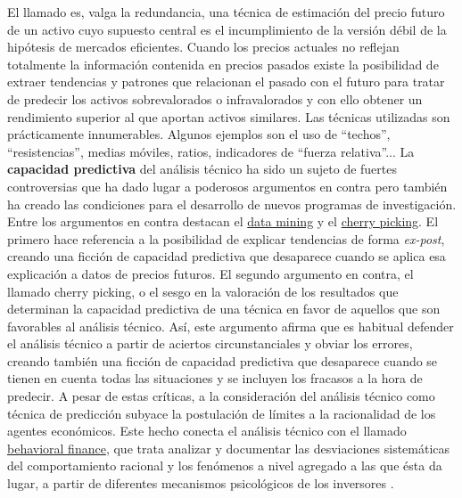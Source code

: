 \documentclass{nuevotema}
\begin{document}
El llamado  es, valga la redundancia, una técnica de estimación del precio futuro de un activo cuyo supuesto central es el incumplimiento de la versión débil de la hipótesis de mercados eficientes. Cuando los precios actuales no reflejan totalmente la información contenida en precios pasados existe la posibilidad de extraer tendencias y patrones que relacionan el pasado con el futuro para tratar de predecir los activos sobrevalorados o infravalorados y con ello obtener un rendimiento superior al que aportan activos similares. Las técnicas utilizadas son prácticamente innumerables. Algunos ejemplos son el uso de ``techos'', ``resistencias'', medias móviles, ratios, indicadores de ``fuerza relativa''... La \textbf{capacidad predictiva} del análisis técnico ha sido un sujeto de fuertes controversias que ha dado lugar a poderosos argumentos en contra pero también ha creado las condiciones para el desarrollo de nuevos programas de investigación. Entre los argumentos en contra destacan el \underline{data mining} y el \underline{cherry picking}. El primero hace referencia a la posibilidad de explicar tendencias de forma \textit{ex-post}, creando una ficción de capacidad predictiva que desaparece cuando se aplica esa explicación a datos de precios futuros. El segundo argumento en contra, el llamado {cherry picking}, o el sesgo en la valoración de los resultados que determinan la capacidad predictiva de una técnica en favor de aquellos que son favorables al análisis técnico. Así, este argumento afirma que es habitual defender el análisis técnico a partir de aciertos circunstanciales y obviar los errores, creando también una ficción de capacidad predictiva que desaparece cuando se tienen en cuenta todas las situaciones y se incluyen los fracasos a la hora de predecir. A pesar de estas críticas, a la consideración del análisis técnico como técnica de predicción subyace la postulación de límites a la racionalidad de los agentes económicos. Este hecho conecta el análisis técnico con el llamado \underline{behavioral finance}, que trata analizar y documentar las desviaciones sistemáticas del comportamiento racional y los fenómenos a nivel agregado a las que ésta da lugar, a partir de diferentes mecanismos psicológicos de los inversores .
\end{document}

